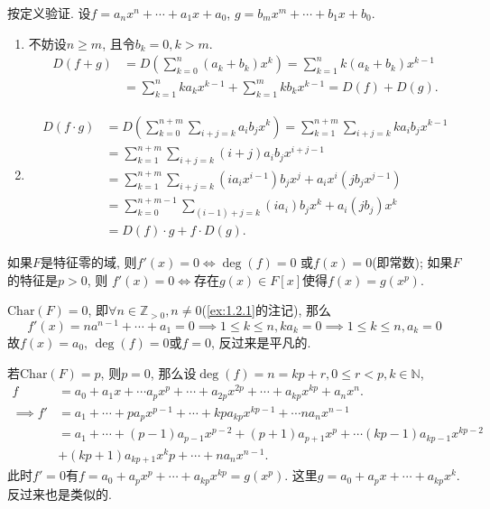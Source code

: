 \begin{solution}
    按定义验证. 设$f = a_nx^n + \cdots + a_1x + a_0$, $g = b_mx^m + \cdots + b_1x + b_0$.
    \begin{enumerate}[(1)]
        \item 不妨设$n \geqslant m$, 且令$b_k = 0, k > m$.
        \[
        \begin{aligned}
            D(f + g) &= D\left(\sum_{k = 0}^{n} (a_k + b_k)x^k\right) = \sum_{k = 1}^{n} k(a_k + b_k)x^{k - 1}\\ 
            &= \sum_{k = 1}^{n} ka_kx^{k - 1} + \sum_{k = 1}^{m} kb_kx^{k - 1} = D(f) + D(g).
        \end{aligned}
        \]
        \item \[
            \begin{aligned}
                D(f \cdot g) &= D\left(\sum_{k = 0}^{n + m} \sum_{i + j = k} a_ib_jx^k\right) = \sum_{k = 1}^{n + m} \sum_{i + j = k} ka_ib_jx^{k - 1}\\
                &= \sum_{k = 1}^{n + m} \sum_{i + j = k} (i + j)a_ib_jx^{i + j - 1}\\
                &= \sum_{k = 1}^{n + m} \sum_{i + j = k} (ia_ix^{i - 1})b_jx^j + a_ix^i(jb_jx^{j - 1})\\
                &= \sum_{k = 0}^{n + m - 1} \sum_{(i - 1) + j = k} (ia_i)b_jx^{k} + a_i(jb_j)x^k\\
                &= D(f) \cdot g + f \cdot D(g).
            \end{aligned}
        \]
    \end{enumerate}
\end{solution}

\begin{problem}
    如果$F$是特征零的域, 则$f'(x) = 0 \Leftrightarrow \deg(f) = 0$
或$f(x) = 0$(即常数); 如果$F$的特征是$p > 0$, 则
$f'(x) = 0 \Leftrightarrow$存在$g(x) \in F[x]$使得$f(x) = g(x^p)$.
\end{problem}

\begin{solution}
    $\mathrm{Char}(F) = 0$, 即$\forall n \in \mathbb{Z}_{>0}, n \neq 0$(\ref{ex:1.2.1}的注记), 那么
\[
    f'(x) = na^{n - 1} + \cdots + a_1 = 0 \implies 1 \leqslant k \leqslant n, ka_k = 0 \implies 1 \leqslant k \leqslant n, a_k = 0
\]
故$f(x) = a_0$, $\deg(f) = 0$或$f = 0$, 反过来是平凡的.

    若$\mathrm{Char}(F) = p$, 则$p = 0$, 那么设$\deg(f) = n = kp + r, 0 \leqslant r < p, k \in \mathbb{N}$,
\[
\begin{aligned}
    f &= a_0 + a_1x + \cdots a_px^p + \cdots + a_{2p}x^{2p} + \cdots + a_{kp}x^{kp} + a_nx^n.\\
    \implies f' &= a_1 + \cdots + pa_px^{p - 1} + \cdots + kpa_{kp}x^{kp - 1} + \cdots na_nx^{n - 1}\\
    &= a_1 + \cdots + (p - 1)a_{p - 1}x^{p - 2} + (p + 1)a_{p + 1}x^p + \cdots (kp - 1)a_{kp - 1}x^{kp - 2}\\
    &+ (kp + 1)a_{kp + 1}x^kp + \cdots + na_nx^{n - 1}.
\end{aligned}
\]
此时$f' = 0$有$f = a_0 + a_px^p + \cdots + a_{kp}x^{kp} = g(x^p)$. 这里$g = a_0 + a_px + \cdots + a_{kp}x^k$. 反过来也是类似的.
\end{solution}

